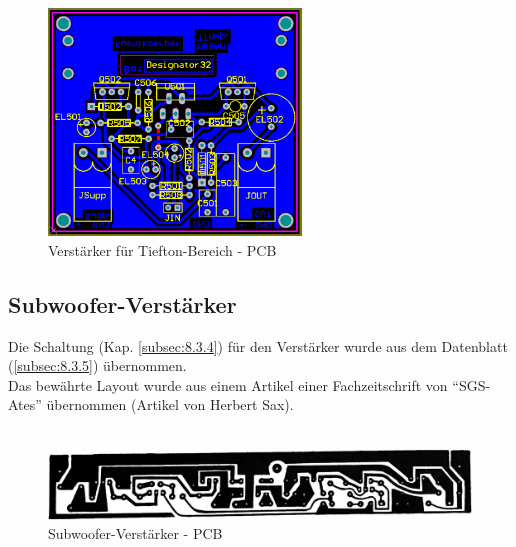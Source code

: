 \begin{figure} [H]
	\centering	
	\includegraphics[width=0.6\textwidth]{img/Print5/5_TTVerstaerker-PCB.PNG}
	\caption{Verstärker für Tiefton-Bereich - PCB}
	\label {fig:5.2.3.1}
\end{figure}


\newpage
\subsection{Subwoofer-Verstärker}
Die Schaltung (Kap. \ref{subsec:8.3.4}) für den Verstärker wurde aus dem Datenblatt (\ref{subsec:8.3.5}) übernommen.\\
Das bewährte Layout wurde aus einem Artikel einer Fachzeitschrift von \enquote{SGS-Ates} übernommen (Artikel von Herbert Sax).
\\ \\

\begin{figure} [H]
	\centering	
	\includegraphics[width=1\textwidth]{img/SubwooferAmpLayout.PNG}
	\caption{Subwoofer-Verstärker - PCB}
	\label {fig:5.2.3.2}
\end{figure}